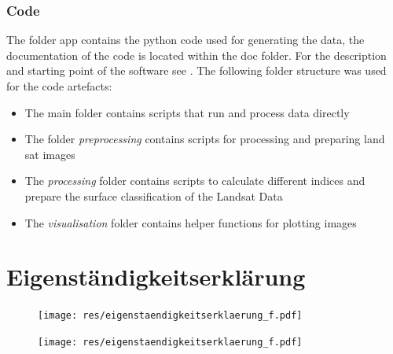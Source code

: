 \documentclass[12pt,a4paper, english,twoside]{scrartcl}
\begin{document}
  \subsubsection{Code}\label{sec:code}
      The folder app contains the python code used for generating the data, the documentation of the code is located within the doc folder.
      For the description and starting point of the software see .
      The following folder structure was used for the code artefacts:
      \begin{itemize}
        \item The main folder contains scripts that run and process data directly
        \item The folder \textit{preprocessing} contains scripts for processing and preparing land sat images
        \item The \textit{processing} folder contains scripts to calculate different indices and prepare the surface classification of the Landsat Data
        \item The \textit{visualisation} folder contains helper functions for plotting images 
      \end{itemize}
\newpage
\printbibliography%
\newpage
{}
\section*{Eigenständigkeitserklärung}\label{sec:eigenstaendigkeit}
\begin{figure}[!b]
    \texttt{[image: res/eigenstaendigkeitserklaerung\_f.pdf]}
\end{figure}
\newpage
\begin{figure}[!b]
    \texttt{[image: res/eigenstaendigkeitserklaerung\_f.pdf]}
\end{figure}
%
\restoregeometry%
\end{document}
